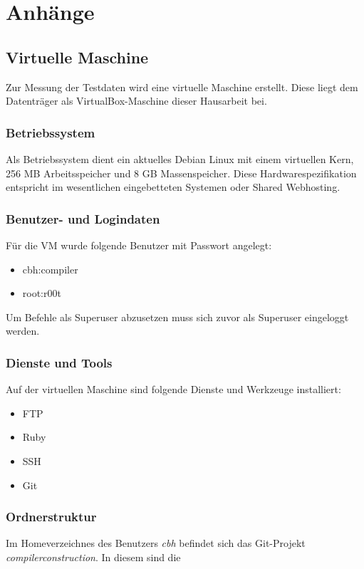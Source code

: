 \section{Anhänge}

\subsection{Virtuelle Maschine}
Zur Messung der Testdaten wird eine virtuelle Maschine erstellt. Diese liegt dem Datenträger als VirtualBox-Maschine dieser Hausarbeit bei. 

\subsubsection{Betriebssystem}
Als Betriebssystem dient ein aktuelles Debian Linux mit einem virtuellen Kern, 256 MB Arbeitsspeicher und 8 GB Massenspeicher. Diese Hardwarespezifikation entspricht im wesentlichen eingebetteten Systemen oder Shared Webhosting. 

\subsubsection{Benutzer- und Logindaten}

Für die VM wurde folgende Benutzer mit Passwort angelegt:
\begin{itemize}
    \item{cbh:compiler}
    \item{root:r00t}
\end{itemize}

Um Befehle als Superuser abzusetzen muss sich zuvor als Superuser eingeloggt werden.

\subsubsection{Dienste und Tools}

Auf der virtuellen Maschine sind folgende Dienste und Werkzeuge installiert: 

\begin{itemize}
    \item{FTP}
    \item{Ruby}
    \item{SSH}
    \item{Git}
\end{itemize}

\subsubsection{Ordnerstruktur}
Im Homeverzeichnes des Benutzers \textit{cbh} befindet sich das Git-Projekt \textit{compilerconstruction}. In diesem sind die 